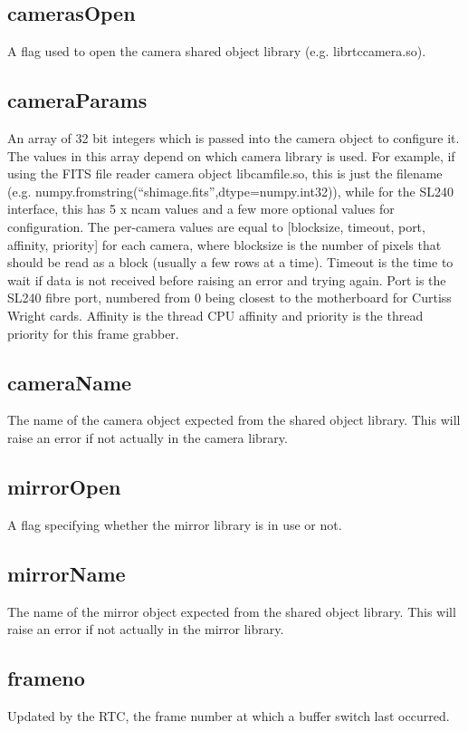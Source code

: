 \documentclass[a4,10pt]{article}
\begin{document}
\subsection{camerasOpen}
A flag used to open the camera shared object library
(e.g. librtccamera.so).  

\subsection{cameraParams}
An array of 32 bit integers which is passed into the camera object to
configure it.  The values in this array depend on which camera library
is used.  For example, if using the FITS file reader camera object
libcamfile.so, this is just the filename
(e.g. numpy.fromstring(``shimage.fits'',dtype=numpy.int32)), while for
the SL240 interface, this has 5 x ncam values and a few more optional
values for configuration.  The per-camera values are equal to
[blocksize, timeout, port, affinity, priority] for each camera, where
blocksize is the number of pixels that should be read as a block
(usually a few rows at a time).  Timeout is the time to wait if data
is not received before raising an error and trying again.  Port is the
SL240 fibre port, numbered from 0 being closest to the motherboard for
Curtiss Wright cards.  Affinity is the thread CPU affinity and
priority is the thread priority for this frame grabber.

\subsection{cameraName}
The name of the camera object expected from the shared object library.
This will raise an error if not actually in the camera library.

\subsection{mirrorOpen}
A flag specifying whether the mirror library is in use or not.

\subsection{mirrorName}
The name of the mirror object expected from the shared object library.
This will raise an error if not actually in the mirror library.

\subsection{frameno}
Updated by the RTC, the frame number at which a buffer switch last
occurred.
\end{document}

